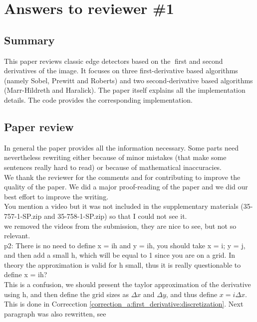 \documentclass[a4paper,10pt]{report}
\begin{document}
\chapter{Answers to reviewer \#1}

\section{Summary}

\que This paper reviews classic edge detectors based on the first and second derivatives of the image. It focuses
on three first-derivative based algorithms (namely Sobel, Prewitt and Roberts) and two second-derivative
based algorithms (Marr-Hildreth and Haralick). The paper itself explains all the implementation details.
The code provides the corresponding implementation.\\

\section{Paper review}

\que In general the paper provides all the information necessary. Some parts need nevertheless rewriting either because of minor mistakes (that make some sentences really hard to read) or because of mathematical inaccuracies.\\

\ans We thank the reviewer for the comments and for contributing to improve the quality of the paper. We did a major proof-reading of the paper and we did our best effort to improve the writing.\\

\que You mention a video but it was not included in the supplementary materials (35-757-1-SP.zip and 35-758-1-SP.zip) so that I could not see it.\\

\ans we removed the videos from the submission, they are nice to see, but not so relevant.\\

\que p2: There is no need to define x = ih and y = ih, you should take x = i; y = j, and then add a small h, which will be equal to 1 since you are on a grid. In theory the approximation is valid for h small, thus it is really questionable to define x = ih? \\

\ans This is a confusion, we should present the taylor approximation of the derivative using h, and then define the grid sizes as $\Delta x$ and $\Delta y$, and thus define $x=i\Delta x$. This is done in Correcction \ref{correction_a:first_derivative:discretization}. Next paragraph was also rewritten, see \\
\end{document}

